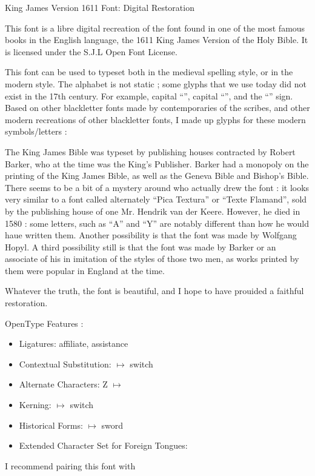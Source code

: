 \documentclass[border=15pt]{standalone}
\begin{document}
\begin{minipage}{4in}
\setlength{\parindent}{10pt}
\setlength{\parskip}{3ex plus 0.5ex minus 0.2ex}
{\Huge{King James Version 1611 Font: Digital Restoration}}

This font is a libre digital recreation of the font found in one of the most famous books in the English language, the 1611 King James Version of the Holy Bible. It is licensed under the S.J.L Open Font License.

This font can be used to typeset both in the medieval spelling style, or in the modern style. The alphabet is not static ; some glyphs that we use today did not exist in the 17th century. For example, capital “{}”, capital “{}”, and the “{}” sign. Based on other blackletter fonts made by contemporaries of the scribes, and other modern recreations of other blackletter fonts, I made up glyphs for these modern symbols/letters : {}

The King James Bible was typeset by publishing houses contracted by Robert Barker, who at the time was the King’s Publisher. Barker had a monopoly on the printing of the King James Bible, as well as the Geneva Bible and Bishop’s Bible. There seems to be a bit of a mystery around who actually drew the font : it looks very similar to a font called alternately “Pica Textura” or “Texte Flamand”, sold by the publishing house of one Mr. Hendrik van der Keere. However, he died in 1580 : some letters, such as “A” and “Y” are notably different than how he would haue written them. Another possibility is that the font was made by Wolfgang Hopyl. A third possibility still is that the font was made by Barker or an associate of his in imitation of the styles of those two men, as works printed by them were popular in England at the time.

Whatever the truth, the font is beautiful, and I hope to have prouided a faithful restoration.

OpenType Features :
    \begin{itemize}
        \item Ligatures: affiliate, assistance
\item Contextual Substitution: {} $\mapsto$ switch
\item Alternate Characters: Z $\mapsto$ {}
\item Kerning: {} $\mapsto$ switch
\item Historical Forms: {} $\mapsto$ sword
\item Extended Character Set for Foreign Tongues: {\color{BrickRed}}
    \end{itemize}
    I recommend pairing this font with {}
\end{minipage}
\end{document}
